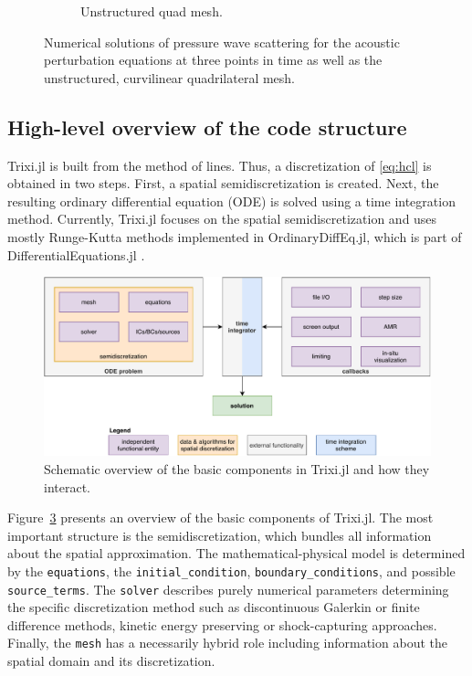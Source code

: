 \documentclass[hidelinks]{juliacon} %
\newcommand{\trixi}{Trixi.jl\xspace}
\begin{document}
\begin{figure}[!h]
\begin{subfigure}{0.475\linewidth}
    \caption{Unstructured quad mesh.}
    \label{fig:ginger_mesh}
  \end{subfigure}%
  \caption{Numerical solutions of pressure wave scattering for the acoustic
                perturbation equations at three points in time as well as the unstructured,
                curvilinear quadrilateral mesh.}
  \label{fig:pressure_waves}
\end{figure}


\subsection{High-level overview of the code structure}

\trixi is built from the method of lines. Thus, a discretization of \eqref{eq:hcl}
is obtained in two steps. First, a spatial semidiscretization is created. Next,
the resulting ordinary differential equation (ODE) is solved using a time
integration method. Currently, \trixi focuses on the spatial semidiscretization
and uses mostly Runge-Kutta methods implemented in OrdinaryDiffEq.jl, which is part
of DifferentialEquations.jl \cite{rackauckas2017differentialequations}.

\begin{figure}[htbp]
  \includegraphics[width=\linewidth]{../figures/trixi_global_overview}
  \caption{Schematic overview of the basic components in \trixi and how they
           interact.}
  \label{fig:trixi_global_overview}
\end{figure}

Figure~\ref{fig:trixi_global_overview} presents an overview of the basic
components of \trixi. The most important structure is the semidiscretization,
which bundles all information about the spatial approximation. The mathematical-physical
model is determined by the \lstinline{equations}, the \lstinline{initial_condition},
\lstinline{boundary_conditions}, and possible \lstinline{source_terms}. The
\lstinline{solver} describes purely numerical parameters determining the specific
discretization method such as discontinuous Galerkin or finite difference
methods, kinetic energy preserving or shock-capturing approaches. Finally, the
\lstinline{mesh} has a necessarily hybrid role including information about the
spatial domain and its discretization.
\end{document}
